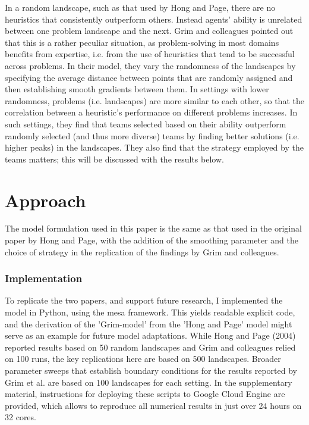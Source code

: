 In a random landscape, such as that used by Hong and Page, there are no heuristics that consistently outperform others. Instead agents' ability is unrelated between one problem landscape and the next. Grim and colleagues pointed out that this is a rather peculiar situation, as problem-solving in most domains benefits from expertise, i.e. from the use of heuristics that tend to be successful across problems. In their model, they vary the randomness of the landscapes by specifying the average distance between points that are randomly assigned and then establishing smooth gradients between them. In settings with lower randomness, problems (i.e. landscapes) are more similar to each other, so that the correlation between a heuristic's performance on different problems increases. In such settings, they find that teams selected based on their ability outperform randomly selected (and thus more diverse) teams by finding better solutions (i.e. higher peaks) in the landscapes. They also find that the strategy employed by the teams matters; this will be discussed with the results below.

\section{Approach}

The model formulation used in this paper is the same as that used in the original paper by Hong and Page, with the addition of the smoothing parameter and the choice of strategy in the replication of the findings by Grim and colleagues.

\subsubsection{Implementation}

To replicate the two papers, and support future research, I implemented the model in Python, using the mesa framework\supercite{kazil2020utilizing}. This yields readable explicit code, and the derivation of the 'Grim-model' from the 'Hong and Page' model might serve as an example for future model adaptations. While Hong and Page (2004) reported results based on 50 random landscapes and Grim and colleagues relied on 100 runs, the key replications here are based on 500 landscapes. Broader parameter sweeps that establish boundary conditions for the results reported by Grim et al. are based on 100 landscapes for each setting. In the supplementary material, instructions for deploying these scripts to Google Cloud Engine are provided, which allows to reproduce all numerical results in just over 24 hours on 32 cores.


